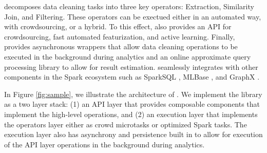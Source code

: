 \projx decomposes data cleaning tasks into three key operators: Extraction, Similarity Join, and Filtering.
These operators can be exectued either in an automated way, with crowdsourcing, or a hybrid.
To this effect, \projx also provides an API for crowdsourcing, fast automated featurization, and active learning.
Finally, \projx provides asynchronous wrappers that allow data cleaning operations to be executed in the background during analytics and an online approximate query processing library to allow for result estimation.
\projx seamlessly integrates with other components in the Spark ecosystem such as SparkSQL \cite{d}, MLBase \cite{d}, and GraphX \cite{d}.

In Figure \ref{fig:sample}, we illustrate the architecture of \projx.
We implement the library as a two layer stack: (1) an API layer that provides composable components that implement the high-level operations, and (2) an execution layer that implements the operators layer either as crowd microtasks or optimized Spark tasks.
The execution layer also has asynchrony and persistence built in to allow for execution of the API layer operations in the background during analytics.

\vspace{0.5em}

